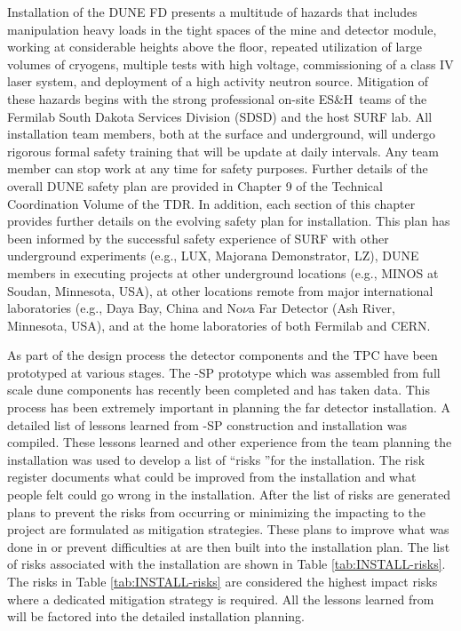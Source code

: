 
Installation of the DUNE FD presents a multitude of hazards that includes  manipulation heavy loads in the tight spaces of the mine and detector module,  working at considerable heights above the floor, repeated utilization of large volumes of cryogens, multiple tests with high voltage, commissioning of a class IV laser system, and deployment of a high activity neutron source. Mitigation of these hazards begins with the strong professional on-site ES\&H\ teams of the Fermilab South Dakota Services Division (SDSD) and the host SURF lab.
All installation team members, both at the surface and underground, will undergo rigorous formal safety training that will be update at daily intervals. Any team member can stop work at any time for safety purposes. Further details of the overall DUNE safety plan are provided in Chapter 9 of the Technical Coordination Volume of the TDR. In addition, each section of this chapter provides further details on the evolving safety plan for installation. This plan has been informed by the successful safety experience of SURF with other underground experiments (e.g., LUX, Majorana Demonstrator, LZ), DUNE members in executing projects at other underground locations (e.g., MINOS at Soudan, Minnesota, USA), at other locations remote from major international laboratories (e.g., Daya Bay, China and No$\nu $a Far Detector (Ash River, Minnesota, USA), and at the home laboratories of both Fermilab and CERN.



As part of the  design process the detector components and the TPC have been prototyped at various stages. The -SP prototype which was assembled from full scale dune components has recently been completed and has taken data. 
This process has been extremely important in planning the far detector installation. A detailed list of lessons learned from -SP construction and installation was compiled.\cite{bib:docdb8255} 
These lessons learned and other experience from the team planning the installation was used to develop a list of \textquotedblleft risks \textquotedblright for the  installation. 
The risk register documents what could be improved from the  installation and what people felt could go wrong in the  installation. After the list of risks are generated plans to prevent the risks from occurring or minimizing the impacting to the project are formulated as mitigation strategies. These plans to improve what was done in  or prevent difficulties at  are then built into the  installation plan. The list of risks associated with the  installation are shown in Table \ref{tab:INSTALL-risks}. The risks in Table \ref{tab:INSTALL-risks} are considered the highest impact risks where a dedicated mitigation strategy is required. All the lessons learned from  will be factored into the detailed installation planning.


